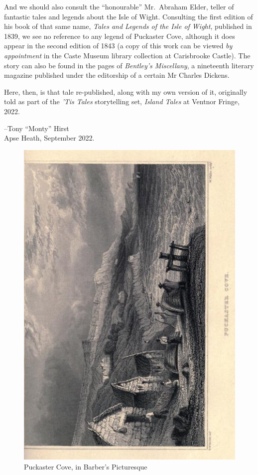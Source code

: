 \documentclass[
  12pt,
  a5paper,
  twoside]{book}
\begin{document}
And we should also consult the ``honourable'' Mr.~Abraham Elder, teller
of fantastic tales and legends about the Isle of Wight. Consulting the
first edition of his book of that same name, \emph{Tales and Legends of
the Isle of Wight}, published in 1839, we see no reference to any legend
of Puckaster Cove, although it does appear in the second edition of 1843
(a copy of this work can be viewed \emph{by appointment} in the Caste
Museum library collection at Carisbrooke Castle). The story can also be
found in the pages of \emph{Bentley's Miscellany}, a nineteenth literary
magazine published under the editorship of a certain Mr Charles Dickens.

Here, then, is that tale re-published, along with my own version of it,
originally told as part of the \emph{'Tis Tales} storytelling set,
\emph{Island Tales} at Ventnor Fringe, 2022.

--Tony ``Monty'' Hirst\\
Apse Heath, September 2022.

\let\thefootnote\relax{}

\begin{figure}[H]

{\centering \includegraphics[width=0.75\linewidth,height=\textheight,keepaspectratio]{images/barberspicturesq00barbiala_0191-cropped.jpg}

}

\caption{Puckaster Cove, in Barber's Picturesque}

\end{figure}%
\end{document}
